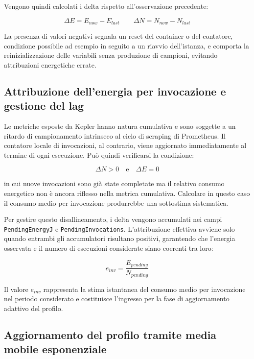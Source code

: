 Vengono quindi calcolati i delta rispetto all'osservazione precedente:

\begin{equation}
    \Delta E = E_{now} - E_{last}
    \qquad
    \Delta N = N_{now} - N_{last}
\end{equation}

La presenza di valori negativi segnala un reset del container o del
contatore, condizione possibile ad esempio in seguito a un riavvio
dell'istanza, e comporta la reinizializzazione delle variabili senza
produzione di campioni, evitando attribuzioni energetiche errate.


\subsection{Attribuzione dell'energia per invocazione e gestione del lag}
\label{subsec:lag}

Le metriche esposte da Kepler hanno natura cumulativa e sono soggette a
un ritardo di campionamento intrinseco al ciclo di scraping di Prometheus.
Il contatore locale di invocazioni, al contrario, viene aggiornato
immediatamente al termine di ogni esecuzione. Può quindi verificarsi la
condizione:

\[
    \Delta N > 0 \quad \text{e} \quad \Delta E = 0
\]

in cui nuove invocazioni sono già state completate ma il relativo consumo
energetico non è ancora riflesso nella metrica cumulativa. Calcolare in
questo caso il consumo medio per invocazione produrrebbe una sottostima
sistematica.

Per gestire questo disallineamento, i delta vengono accumulati nei
campi \texttt{PendingEnergyJ} e \texttt{PendingInvocations}. L'attribuzione
effettiva avviene solo quando entrambi gli accumulatori risultano positivi,
garantendo che l'energia osservata e il numero di esecuzioni considerate
siano coerenti tra loro:

\begin{equation}
    e_{inv} = \frac{E_{pending}}{N_{pending}}
\end{equation}

Il valore $e_{inv}$ rappresenta la stima istantanea del consumo medio
per invocazione nel periodo considerato e costituisce l'ingresso per la
fase di aggiornamento adattivo del profilo.


\subsection{Aggiornamento del profilo tramite media mobile esponenziale}
\label{subsec:ema}


